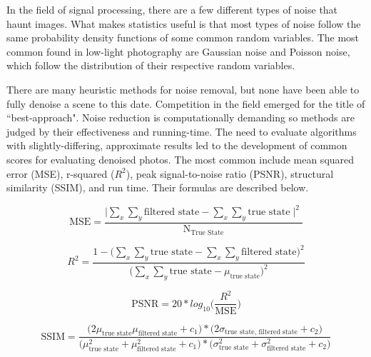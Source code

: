\documentclass{ncjms}
\begin{document}
In the field of signal processing, there are a few different types of noise that haunt images. What makes statistics useful is that most types of noise follow the same probability density functions of some common random variables. The most common found in low-light photography are Gaussian noise and Poisson noise, which follow the distribution of their respective random variables.

There are many heuristic methods for noise removal, but none have been able to fully denoise a scene to this date. Competition in the field emerged for the title of ``best-approach". Noise reduction is computationally demanding so methods are judged by their effectiveness and running-time. The need to evaluate algorithms with slightly-differing, approximate results led to the development of common scores for evaluating denoised photos. The most common include mean squared error (MSE), r-squared ($R^2$), peak signal-to-noise ratio (PSNR), structural similarity (SSIM), and run time. Their formulas are described below. 

\begin{equation}
    \text{MSE} = \frac{\mid \sum_{x} \sum_{y} \text{filtered state} - \sum_{x} \sum_{y} \text{true state} \mid^2} { \text{N}_{\text{True State}}}
\end{equation}

\begin{equation}
  R^2 = \frac{1 - \big( \sum_{x} \sum_{y}\text{true state} - \sum_{x} \sum_{y}\text{filtered state} \big)^2} {\big(\sum_{x} \sum_{y}\text{true state} - \mu_{\text{true state}} \big)^2}
\end{equation}

\begin{equation}  
  \text{PSNR} = 20* log_{10}\big(\frac{R^2}{\text{MSE}}\big)
\end{equation}  

\begin{equation}
   \text{SSIM} = \frac{\big( 2\mu_{\text{true state}}\mu_{\text{filtered state}} + c_1\big)*\big( 2\sigma_{\text{true state, filtered state}} + c_2\big)}{\big( \mu^2_{\text{true state}} + \mu^2_{\text{filtered state}} + c_1\big) * \big( \sigma^2_{\text{true state}} + \sigma^2_{\text{filtered state}} + c_2\big)}
\end{equation}    
\newline
\end{document}
